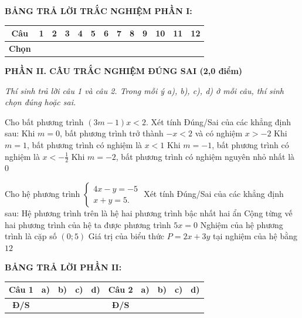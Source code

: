 \documentclass[12pt,a4paper]{article}
\begin{document}
\vspace{1mm}
\noindent\textbf{BẢNG TRẢ LỜI TRẮC NGHIỆM PHẦN I:}
\begin{center}
\begin{tabular}{|c|c|c|c|c|c|c|c|c|c|c|c|c|}
\hline
\textbf{Câu} & \textbf{1} & \textbf{2} & \textbf{3} & \textbf{4} & \textbf{5} & \textbf{6} & \textbf{7} & \textbf{8} & \textbf{9} & \textbf{10} & \textbf{11} & \textbf{12} \\
\hline
\textbf{Chọn} & \rule{0pt}{0.65cm} & & & & & & & & & & & \\
\hline
\end{tabular}
\end{center}
\vspace{2mm}

\setcounter{ex}{0}
\noindent\textbf{\large PHẦN II. CÂU TRẮC NGHIỆM ĐÚNG SAI (2,0 điểm)}

\textit{Thí sinh trả lời câu 1 và câu 2. Trong mỗi ý a), b), c), d) ở mỗi câu, thí sinh chọn đúng hoặc sai.}

\vspace{1mm}
\begin{ex}
Cho bất phương trình $(3m - 1)x < 2$. Xét tính Đúng/Sai của các khẳng định sau:
\choiceTF
{\True Khi $m = 0$, bất phương trình trở thành $-x < 2$ và có nghiệm $x > -2$}
{\True Khi $m = 1$, bất phương trình có nghiệm là $x < 1$}
{Khi $m = -1$, bất phương trình có nghiệm là $x < -\frac{1}{2}$}
{\True Khi $m = -2$, bất phương trình có nghiệm nguyên nhỏ nhất là $0$}
\end{ex}

\begin{ex}
Cho hệ phương trình $\begin{cases} 4x - y = -5 \\ x + y = 5. \end{cases}$ Xét tính Đúng/Sai của các khẳng định sau:
\choiceTF
{\True Hệ phương trình trên là hệ hai phương trình bậc nhất hai ẩn}
{\True Cộng từng vế hai phương trình của hệ ta được phương trình $5x = 0$}
{\True Nghiệm của hệ phương trình là cặp số $(0; 5)$}
{Giá trị của biểu thức $P = 2x + 3y$ tại nghiệm của hệ bằng $12$}
\end{ex}


\noindent\textbf{BẢNG TRẢ LỜI PHẦN II:}
\begin{center}
\begin{tabular}{|c|c|c|c|c||c|c|c|c|c|}
\hline
\textbf{Câu 1} & \textbf{a)} & \textbf{b)} & \textbf{c)} & \textbf{d)} & \textbf{Câu 2} & \textbf{a)} & \textbf{b)} & \textbf{c)} & \textbf{d)} \\
\hline
\textbf{Đ/S} & \rule{0pt}{0.6cm} & & & & \textbf{Đ/S} & & & & \\
\hline
\end{tabular}
\end{center}
\vspace{2mm}
\end{document}
